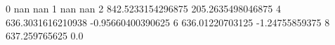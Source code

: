 0 nan nan
1 nan nan
2 842.5233154296875 205.2635498046875
4 636.3031616210938 -0.95660400390625
6 636.01220703125 -1.24755859375
8 637.259765625 0.0
